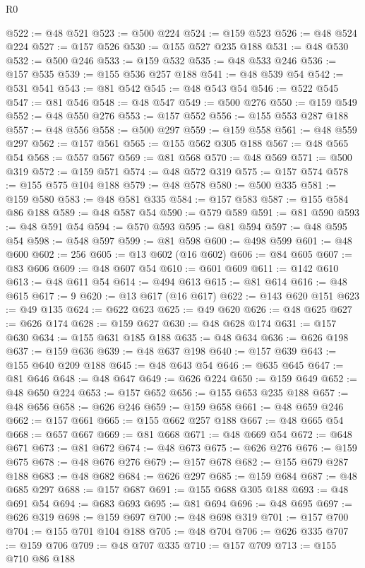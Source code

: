 \begin{lexlean}{R0}
\begin{coremodule}
@522 := @48 @521
@523 := @500 @224
@524 := @159 @523
@526 := @48 @524 @224
@527 := @157 @526
@530 := @155 @527 @235 @188
@531 := @48 @530
@532 := @500 @246
@533 := @159 @532
@535 := @48 @533 @246
@536 := @157 @535
@539 := @155 @536 @257 @188
@541 := @48 @539 @54
@542 := @531 @541
@543 := @81 @542
@545 := @48 @543 @54
@546 := @522 @545
@547 := @81 @546
@548 := @48 @547
@549 := @500 @276
@550 := @159 @549
@552 := @48 @550 @276
@553 := @157 @552
@556 := @155 @553 @287 @188
@557 := @48 @556
@558 := @500 @297
@559 := @159 @558
@561 := @48 @559 @297
@562 := @157 @561
@565 := @155 @562 @305 @188
@567 := @48 @565 @54
@568 := @557 @567
@569 := @81 @568
@570 := @48 @569
@571 := @500 @319
@572 := @159 @571
@574 := @48 @572 @319
@575 := @157 @574
@578 := @155 @575 @104 @188
@579 := @48 @578
@580 := @500 @335
@581 := @159 @580
@583 := @48 @581 @335
@584 := @157 @583
@587 := @155 @584 @86 @188
@589 := @48 @587 @54
@590 := @579 @589
@591 := @81 @590
@593 := @48 @591 @54
@594 := @570 @593
@595 := @81 @594
@597 := @48 @595 @54
@598 := @548 @597
@599 := @81 @598
@600 := @498 @599
@601 := @48 @600
@602 := 256
@605 := @13 @602 (@16 @602)
@606 := @84 @605
@607 := @83 @606
@609 := @48 @607 @54
@610 := @601 @609
@611 := @142 @610
@613 := @48 @611 @54
@614 := @494 @613
@615 := @81 @614
@616 := @48 @615
@617 := 9
@620 := @13 @617 (@16 @617)
@622 := @143 @620 @151
@623 := @49 @135
@624 := @622 @623
@625 := @49 @620
@626 := @48 @625
@627 := @626 @174
@628 := @159 @627
@630 := @48 @628 @174
@631 := @157 @630
@634 := @155 @631 @185 @188
@635 := @48 @634
@636 := @626 @198
@637 := @159 @636
@639 := @48 @637 @198
@640 := @157 @639
@643 := @155 @640 @209 @188
@645 := @48 @643 @54
@646 := @635 @645
@647 := @81 @646
@648 := @48 @647
@649 := @626 @224
@650 := @159 @649
@652 := @48 @650 @224
@653 := @157 @652
@656 := @155 @653 @235 @188
@657 := @48 @656
@658 := @626 @246
@659 := @159 @658
@661 := @48 @659 @246
@662 := @157 @661
@665 := @155 @662 @257 @188
@667 := @48 @665 @54
@668 := @657 @667
@669 := @81 @668
@671 := @48 @669 @54
@672 := @648 @671
@673 := @81 @672
@674 := @48 @673
@675 := @626 @276
@676 := @159 @675
@678 := @48 @676 @276
@679 := @157 @678
@682 := @155 @679 @287 @188
@683 := @48 @682
@684 := @626 @297
@685 := @159 @684
@687 := @48 @685 @297
@688 := @157 @687
@691 := @155 @688 @305 @188
@693 := @48 @691 @54
@694 := @683 @693
@695 := @81 @694
@696 := @48 @695
@697 := @626 @319
@698 := @159 @697
@700 := @48 @698 @319
@701 := @157 @700
@704 := @155 @701 @104 @188
@705 := @48 @704
@706 := @626 @335
@707 := @159 @706
@709 := @48 @707 @335
@710 := @157 @709
@713 := @155 @710 @86 @188

\end{coremodule}
\end{lexlean}
